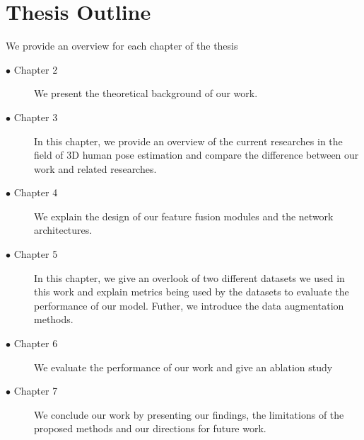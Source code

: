 \section{Thesis Outline}
We provide an overview for each chapter of the thesis
\begin{description}
  \item[$\bullet$ Chapter 2] \noindent We present the theoretical background of our work. 
  \item[$\bullet$ Chapter 3] \noindent In this chapter, we provide an overview of the current researches in the field of 3D human pose estimation and compare the \noindent difference between our work and related researches.  
  \item[$\bullet$ Chapter 4] \noindent We explain the design of our feature fusion modules and the network architectures.  
  \item[$\bullet$ Chapter 5] \noindent In this chapter, we give an overlook of two different datasets we used in this work and explain metrics being used by the datasets to evaluate the performance of our model. Futher, we introduce the data augmentation methods. 
  \item[$\bullet$ Chapter 6] \noindent We evaluate the performance of our work and give an ablation study
  \item[$\bullet$ Chapter 7] \noindent We conclude our work by presenting our findings, the limitations
of the proposed methods and our directions for future work.
\end{description}



